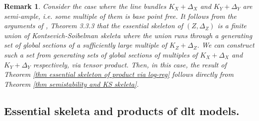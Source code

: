 \documentclass{amsart}%
\numberwithin{equation}{subsection}
\theoremstyle{plain2}
\theoremstyle{definition2}
\newtheorem{rem}[equation]{Remark}
\theoremstyle{stepstyle}
\theoremstyle{point}
\theoremstyle{subpoint}
\begin{document}
\begin{rem}
Consider the case where the line bundles $K_X + \Delta_X$ and $K_Y + \Delta_Y$ are semi-ample, i.e. some multiple of them is base point free. It follows from the arguments of \cite{NicaiseXu}, Theorem 3.3.3 that the essential skeleton of $(Z,\Delta_Z)$ is a finite union of Kontsevich-Soibelman skeleta where the union runs through a generating set of global sections of a sufficiently large multiple of $K_Z+\Delta_Z$. We can construct such a set from generating sets of global sections of multiples of $K_X + \Delta_X$ and $K_Y+ \Delta_Y$ respectively, via tensor product. Then, in this case, the result of Theorem \ref{thm essential skeleton of product via log-reg} follows directly from Theorem \ref{thm semistability and KS skeleta}.
\end{rem}


\subsection{Essential skeleta and products of dlt models.}
\end{document}
